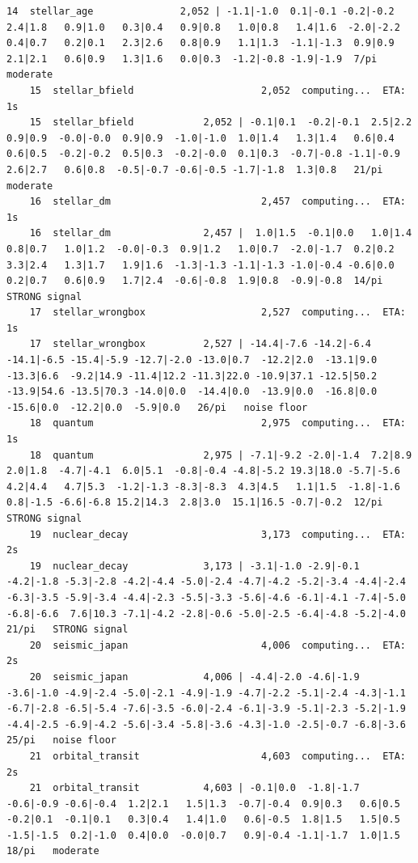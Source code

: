 \documentclass[11pt, letterpaper, openany]{book}
\begin{document}
\begin{empiricalbox}
\begin{lstlisting}[style=terminal]
    14  stellar_age               2,052 | -1.1|-1.0  0.1|-0.1 -0.2|-0.2  2.4|1.8   0.9|1.0   0.3|0.4   0.9|0.8   1.0|0.8   1.4|1.6  -2.0|-2.2  0.4|0.7   0.2|0.1   2.3|2.6   0.8|0.9   1.1|1.3  -1.1|-1.3  0.9|0.9   2.1|2.1   0.6|0.9   1.3|1.6   0.0|0.3  -1.2|-0.8 -1.9|-1.9  7/pi    moderate
    15  stellar_bfield                      2,052  computing...  ETA: 1s
    15  stellar_bfield            2,052 | -0.1|0.1  -0.2|-0.1  2.5|2.2   0.9|0.9  -0.0|-0.0  0.9|0.9  -1.0|-1.0  1.0|1.4   1.3|1.4   0.6|0.4   0.6|0.5  -0.2|-0.2  0.5|0.3  -0.2|-0.0  0.1|0.3  -0.7|-0.8 -1.1|-0.9  2.6|2.7   0.6|0.8  -0.5|-0.7 -0.6|-0.5 -1.7|-1.8  1.3|0.8   21/pi   moderate
    16  stellar_dm                          2,457  computing...  ETA: 1s
    16  stellar_dm                2,457 |  1.0|1.5  -0.1|0.0   1.0|1.4   0.8|0.7   1.0|1.2  -0.0|-0.3  0.9|1.2   1.0|0.7  -2.0|-1.7  0.2|0.2   3.3|2.4   1.3|1.7   1.9|1.6  -1.3|-1.3 -1.1|-1.3 -1.0|-0.4 -0.6|0.0   0.2|0.7   0.6|0.9   1.7|2.4  -0.6|-0.8  1.9|0.8  -0.9|-0.8  14/pi   STRONG signal
    17  stellar_wrongbox                    2,527  computing...  ETA: 1s
    17  stellar_wrongbox          2,527 | -14.4|-7.6 -14.2|-6.4 -14.1|-6.5 -15.4|-5.9 -12.7|-2.0 -13.0|0.7  -12.2|2.0  -13.1|9.0  -13.3|6.6  -9.2|14.9 -11.4|12.2 -11.3|22.0 -10.9|37.1 -12.5|50.2 -13.9|54.6 -13.5|70.3 -14.0|0.0  -14.4|0.0  -13.9|0.0  -16.8|0.0  -15.6|0.0  -12.2|0.0  -5.9|0.0   26/pi   noise floor
    18  quantum                             2,975  computing...  ETA: 1s
    18  quantum                   2,975 | -7.1|-9.2 -2.0|-1.4  7.2|8.9   2.0|1.8  -4.7|-4.1  6.0|5.1  -0.8|-0.4 -4.8|-5.2 19.3|18.0 -5.7|-5.6  4.2|4.4   4.7|5.3  -1.2|-1.3 -8.3|-8.3  4.3|4.5   1.1|1.5  -1.8|-1.6  0.8|-1.5 -6.6|-6.8 15.2|14.3  2.8|3.0  15.1|16.5 -0.7|-0.2  12/pi   STRONG signal
    19  nuclear_decay                       3,173  computing...  ETA: 2s
    19  nuclear_decay             3,173 | -3.1|-1.0 -2.9|-0.1 -4.2|-1.8 -5.3|-2.8 -4.2|-4.4 -5.0|-2.4 -4.7|-4.2 -5.2|-3.4 -4.4|-2.4 -6.3|-3.5 -5.9|-3.4 -4.4|-2.3 -5.5|-3.3 -5.6|-4.6 -6.1|-4.1 -7.4|-5.0 -6.8|-6.6  7.6|10.3 -7.1|-4.2 -2.8|-0.6 -5.0|-2.5 -6.4|-4.8 -5.2|-4.0  21/pi   STRONG signal
    20  seismic_japan                       4,006  computing...  ETA: 2s
    20  seismic_japan             4,006 | -4.4|-2.0 -4.6|-1.9 -3.6|-1.0 -4.9|-2.4 -5.0|-2.1 -4.9|-1.9 -4.7|-2.2 -5.1|-2.4 -4.3|-1.1 -6.7|-2.8 -6.5|-5.4 -7.6|-3.5 -6.0|-2.4 -6.1|-3.9 -5.1|-2.3 -5.2|-1.9 -4.4|-2.5 -6.9|-4.2 -5.6|-3.4 -5.8|-3.6 -4.3|-1.0 -2.5|-0.7 -6.8|-3.6  25/pi   noise floor
    21  orbital_transit                     4,603  computing...  ETA: 2s
    21  orbital_transit           4,603 | -0.1|0.0  -1.8|-1.7 -0.6|-0.9 -0.6|-0.4  1.2|2.1   1.5|1.3  -0.7|-0.4  0.9|0.3   0.6|0.5  -0.2|0.1  -0.1|0.1   0.3|0.4   1.4|1.0   0.6|-0.5  1.8|1.5   1.5|0.5  -1.5|-1.5  0.2|-1.0  0.4|0.0  -0.0|0.7   0.9|-0.4 -1.1|-1.7  1.0|1.5   18/pi   moderate

\end{lstlisting}
\end{empiricalbox}
\end{document}
